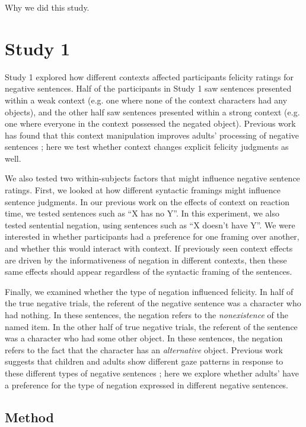 \documentclass[10pt,letterpaper]{article}
\begin{document}
Why we did this study.
\section{Study 1}

Study 1 explored how different contexts affected participants felicity ratings for negative sentences.  Half of the participants in Study 1 saw sentences presented within a weak context (e.g. one where none of the context characters had any objects), and the other half saw sentences presented within a strong context (e.g. one where everyone in the context possessed the negated object).  Previous work has found that this context manipulation improves adults' processing of negative sentences \cite{nordmeyer2014}; here we test whether context changes explicit felicity judgments as well.  

We also tested two within-subjects factors that might influence negative sentence ratings.  First, we looked at how different syntactic framings might influence sentence judgments.  In our previous work on the effects of context on reaction time, we tested sentences such as ``X has no Y''.  In this experiment, we also tested sentential negation, using sentences such as ``X doesn't have Y''.  We were interested in whether participants had a preference for one framing over another, and whether this would interact with context.  If previously seen context effects are driven by the informativeness of negation in different contexts, then these same effects should appear regardless of the syntactic framing of the sentences.  

Finally, we examined whether the type of negation influenced felicity.  In half of the true negative trials, the referent of the negative sentence was a character who had nothing.  In these sentences, the negation refers to the \emph{nonexistence} of the named item.  In the other half of true negative trials, the referent of the sentence was a character who had some other object.  In these sentences, the negation refers to the fact that the character has an \emph{alternative} object.  Previous work suggests that children and adults show different gaze patterns in response to these different types of negative sentences \cite{nordmeyer2014b}; here we explore whether adults' have a preference for the type of negation expressed in different negative sentences.

\subsection{Method}
\end{document}
